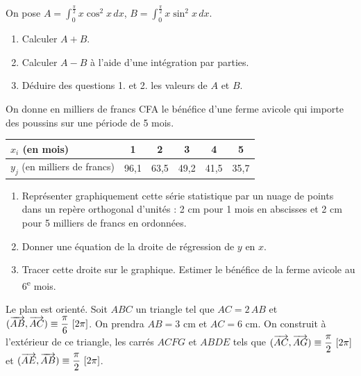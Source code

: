 \documentclass[11pt]{article}
\begin{document}


On pose $\displaystyle A = \int_0^{\frac{\pi}{2}} x\cos^2 x\,dx$, \quad $\displaystyle B = \int_0^{\frac{\pi}{2}} x\sin^2 x\,dx$.

\begin{enumerate}
  \item Calculer $A + B$.
  \item Calculer $A - B$ à l'aide d'une intégration par parties.
  \item Déduire des questions 1. et 2. les valeurs de $A$ et $B$.
\end{enumerate}


On donne en milliers de francs CFA le bénéfice d'une ferme avicole qui importe des poussins sur une période de 5 mois.

\begin{center}
\renewcommand{\arraystretch}{1.3}
\begin{tabular}{|l|c|c|c|c|c|}
\hline
$x_i$ (en mois) & 1 & 2 & 3 & 4 & 5 \\
\hline
$y_j$ (en milliers de francs) & 96,1 & 63,5 & 49,2 & 41,5 & 35,7 \\
\hline
\end{tabular}
\end{center}

\begin{enumerate}
  \item Représenter graphiquement cette série statistique par un nuage de points dans un repère orthogonal d'unités : 2 cm pour 1 mois en abscisses et 2 cm pour 5 milliers de francs en ordonnées.
  \item Donner une équation de la droite de régression de $y$ en $x$.
  \item Tracer cette droite sur le graphique. Estimer le bénéfice de la ferme avicole au 6\textsuperscript{e} mois.
\end{enumerate}


Le plan est orienté. Soit $ABC$ un triangle tel que $AC = 2\,AB$ et $(\vv{AB},\vv{AC}) \equiv \dfrac{\pi}{6}\ [2\pi]$. On prendra $AB = 3$ cm et $AC = 6$ cm. On construit à l'extérieur de ce triangle, les carrés $ACFG$ et $ABDE$ tels que $(\overrightarrow{AC},\overrightarrow{AG}) \equiv \dfrac{\pi}{2}\ [2\pi]$ et $(\vv{AE},\vv{AB}) \equiv \dfrac{\pi}{2}\ [2\pi]$.
\end{document}
